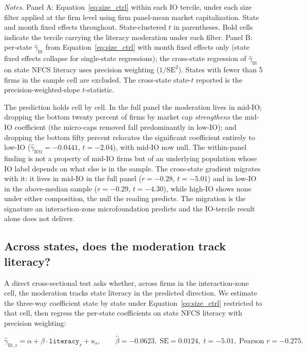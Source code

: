 \begin{table}[t]
\medskip
{\footnotesize\textit{Notes.} Panel A: Equation~\eqref{eq:size_ctrl} within each IO tercile, under each size filter applied at the firm level using firm panel-mean market capitalization. State and month fixed effects throughout. State-clustered $t$ in parentheses. Bold cells indicate the tercile carrying the literacy moderation under each filter. Panel B: per-state $\hat\gamma_{\text{lit}}$ from Equation~\eqref{eq:size_ctrl} with month fixed effects only (state fixed effects collapse for single-state regressions); the cross-state regression of $\hat\gamma_{\text{lit}}$ on state NFCS literacy uses precision weighting ($1/\mathrm{SE}^{2}$). States with fewer than 5 firms in the sample cell are excluded. The cross-state state-$t$ reported is the precision-weighted-slope $t$-statistic.}
\end{table}

The prediction holds cell by cell. In the full panel the moderation lives in mid-IO; dropping the bottom twenty percent of firms by market cap \emph{strengthens} the mid-IO coefficient (the micro-caps removed fall predominantly in low-IO); and dropping the bottom fifty percent relocates the significant coefficient entirely to low-IO ($\hat\gamma_{\text{IO1}} = -0.0441$, $t = -2.04$), with mid-IO now null. The within-panel finding is not a property of mid-IO firms but of an underlying population whose IO label depends on what else is in the sample. The cross-state gradient migrates with it: it lives in mid-IO in the full panel ($r = -0.28$, $t = -5.01$) and in low-IO in the above-median sample ($r = -0.29$, $t = -4.30$), while high-IO shows none under either composition, the null the reading predicts. The migration is the signature an interaction-zone microfoundation predicts and the IO-tercile result alone does not deliver.

\subsection{Across states, does the moderation track literacy?}
\label{sec:cross_state_grad}

A direct cross-sectional test asks whether, across firms in the interaction-zone cell, the moderation tracks state literacy in the predicted direction. We estimate the three-way coefficient state by state under Equation~\eqref{eq:size_ctrl} restricted to that cell, then regress the per-state coefficients on state NFCS literacy with precision weighting:

\begin{equation}
\hat\gamma_{\text{lit}, s} = \alpha + \beta \cdot \mathtt{literacy}_{s} + u_{s}, \qquad \hat\beta = -0.0623, \; \mathrm{SE} = 0.0124, \; t = -5.01, \; \text{Pearson } r = -0.275.
\end{equation}

